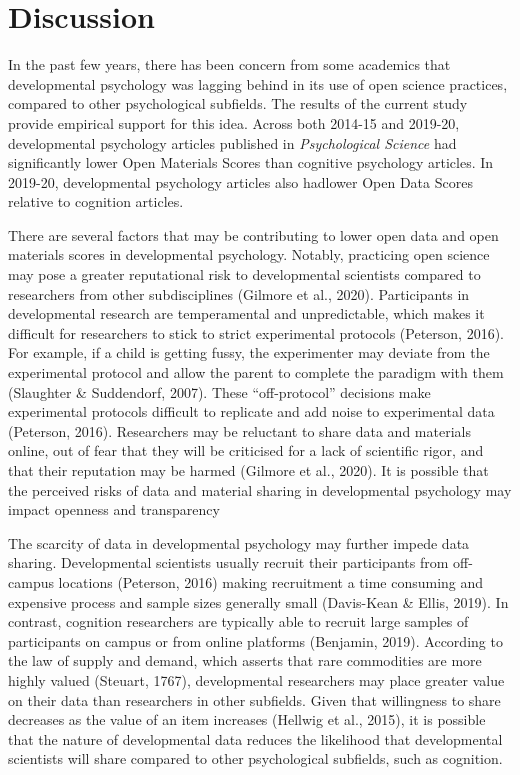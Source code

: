 \documentclass[
  english,
  man,floatsintext]{apa6}
\begin{document}
\hypertarget{discussion}{%
\section{Discussion}\label{discussion}}

In the past few years, there has been concern from some academics that developmental psychology was lagging behind in its use of open science practices, compared to other psychological subfields. The results of the current study provide empirical support for this idea. Across both 2014-15 and 2019-20, developmental psychology articles published in \emph{Psychological Science} had significantly lower Open Materials Scores than cognitive psychology articles. In 2019-20, developmental psychology articles also hadlower Open Data Scores relative to cognition articles.

There are several factors that may be contributing to lower open data and open materials scores in developmental psychology. Notably, practicing open science may pose a greater reputational risk to developmental scientists compared to researchers from other subdisciplines (Gilmore et al., 2020). Participants in developmental research are temperamental and unpredictable, which makes it difficult for researchers to stick to strict experimental protocols (Peterson, 2016). For example, if a child is getting fussy, the experimenter may deviate from the experimental protocol and allow the parent to complete the paradigm with them (Slaughter \& Suddendorf, 2007). These ``off-protocol'' decisions make experimental protocols difficult to replicate and add noise to experimental data (Peterson, 2016). Researchers may be reluctant to share data and materials online, out of fear that they will be criticised for a lack of scientific rigor, and that their reputation may be harmed (Gilmore et al., 2020). It is possible that the perceived risks of data and material sharing in developmental psychology may impact openness and transparency

The scarcity of data in developmental psychology may further impede data sharing. Developmental scientists usually recruit their participants from off-campus locations (Peterson, 2016) making recruitment a time consuming and expensive process and sample sizes generally small (Davis-Kean \& Ellis, 2019). In contrast, cognition researchers are typically able to recruit large samples of participants on campus or from online platforms (Benjamin, 2019). According to the law of supply and demand, which asserts that rare commodities are more highly valued (Steuart, 1767), developmental researchers may place greater value on their data than researchers in other subfields. Given that willingness to share decreases as the value of an item increases (Hellwig et al., 2015), it is possible that the nature of developmental data reduces the likelihood that developmental scientists will share compared to other psychological subfields, such as cognition.
\end{document}
